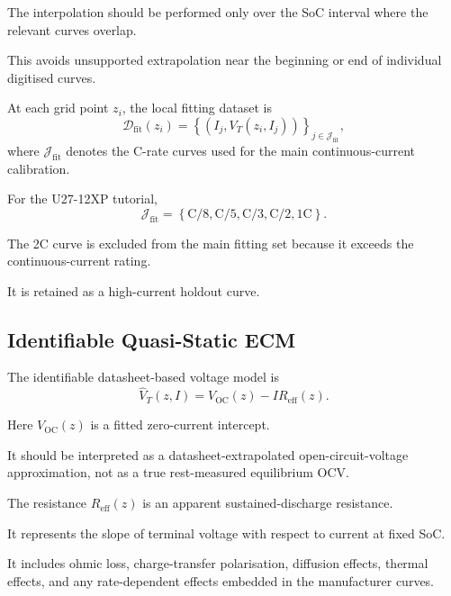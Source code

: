 \documentclass[a4paper,12pt]{article}
\begin{document}
The interpolation should be performed only over the SoC interval where the relevant curves overlap.

This avoids unsupported extrapolation near the beginning or end of individual digitised curves.

At each grid point \(z_i\), the local fitting dataset is
\begin{equation}
\mathcal{D}_{\mathrm{fit}}(z_i)
=
\left\{
\left(I_j,V_T(z_i,I_j)\right)
\right\}_{j\in\mathcal{J}_{\mathrm{fit}}},
\label{eq:method_fixed_soc_dataset}
\end{equation}
where \(\mathcal{J}_{\mathrm{fit}}\) denotes the C-rate curves used for the main continuous-current calibration.

For the U27-12XP tutorial,
\begin{equation}
\mathcal{J}_{\mathrm{fit}}
=
\left\{
\mathrm{C/8},
\mathrm{C/5},
\mathrm{C/3},
\mathrm{C/2},
\mathrm{1C}
\right\}.
\label{eq:method_fit_curve_set}
\end{equation}

The 2C curve is excluded from the main fitting set because it exceeds the continuous-current rating.

It is retained as a high-current holdout curve.

\subsection{Identifiable Quasi-Static ECM}

The identifiable datasheet-based voltage model is
\begin{equation}
\hat{V}_T(z,I)
=
V_{\mathrm{OC}}(z)
-
I R_{\mathrm{eff}}(z).
\label{eq:method_static_voltage_model}
\end{equation}

Here \(V_{\mathrm{OC}}(z)\) is a fitted zero-current intercept.

It should be interpreted as a datasheet-extrapolated open-circuit-voltage approximation, not as a true rest-measured equilibrium OCV.

The resistance \(R_{\mathrm{eff}}(z)\) is an apparent sustained-discharge resistance.

It represents the slope of terminal voltage with respect to current at fixed SoC.

It includes ohmic loss, charge-transfer polarisation, diffusion effects, thermal effects, and any rate-dependent effects embedded in the manufacturer curves.
\end{document}
